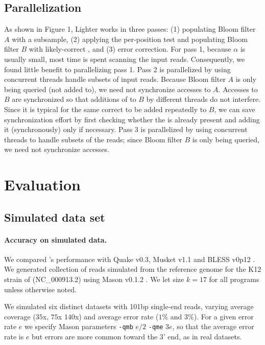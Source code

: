 \documentclass{bmcart}
\begin{document}
\subsection*{Parallelization} 
As shown in Figure 1, Lighter works in three passes: (1) populating Bloom filter $A$ with a \kmer subsample, (2) applying the per-position test and populating Bloom filter $B$ with likely-correct \kmers, and (3) error correction.  For pass 1, because $\alpha$ is usually small, most time is spent scanning the input reads.  Consequently, we found little benefit to parallelizing pass 1.  Pass 2 is parallelized by using concurrent threads handle subsets of input reads.  Because Bloom filter $A$ is only being queried (not added to), we need not synchronize accesses to $A$.  Accesses to $B$ are synchronized so that additions of \kmers to $B$ by different threads do not interfere.  Since it is typical for the same correct \kmer to be added repeatedly to $B$, we can save synchronization effort by first checking whether the \kmer is already present and adding it (synchronously) only if necessary.  Pass 3 is parallelized by using concurrent threads to handle subsets of the reads; since Bloom filter $B$ is only being queried, we need not synchronize accesses.

\section*{Evaluation}
\subsection*{Simulated data set}

\paragraph{Accuracy on simulated data.} We compared \tool's performance with Quake v0.3\cite{kelley2010quake}, Musket v1.1\cite{liu2013musket} and BLESS v0p12 \cite{heo2014bless}.  We generated collection of reads simulated from the reference genome for the K12 strain of \ecoli (NC\_000913.2) using Mason v0.1.2 \cite{holtgrewe2010mason}.  We let \kmer size $k=17$ for all programs unless otherwise noted.

We simulated six distinct datasets with 101bp single-end reads, varying average coverage ($35$x, $75$x $140$x) and average error rate ($1\%$ and $3\%$).  For a given error rate $e$ we specify Mason parameters \verb+-qmb+ $e/2$ \verb+-qme+ $3e$, so that the average error rate is $e$ but errors are more common toward the 3' end, as in real datasets.
\end{document}
